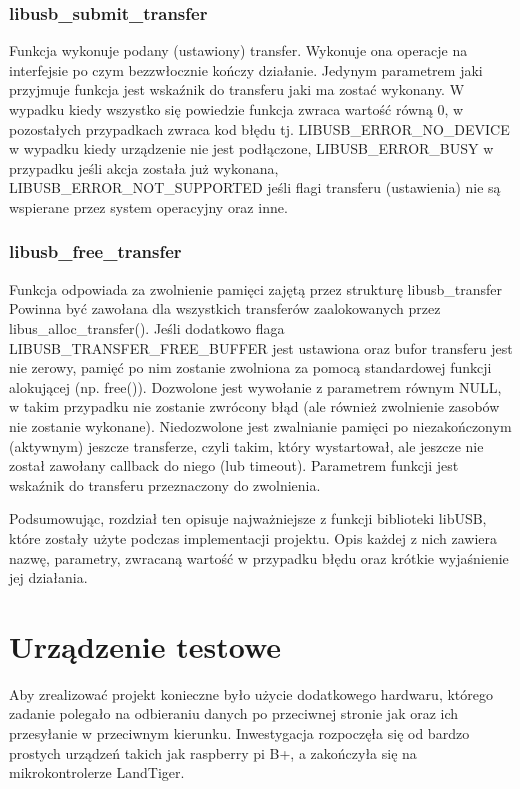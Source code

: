 \documentclass{BscUS}
\newcommand\blankpage{%
    \null
    \thispagestyle{empty}%
    \newpage}
\begin{document}
\subsection{libusb\_submit\_transfer}
\noindent Funkcja wykonuje podany (ustawiony) transfer.
Wykonuje ona operacje na interfejsie po czym bezzwłocznie kończy działanie.
Jedynym parametrem jaki przyjmuje funkcja jest wskaźnik do transferu jaki ma zostać wykonany.
\newline
W wypadku kiedy wszystko się powiedzie funkcja zwraca wartość równą 0, w pozostałych przypadkach zwraca kod błędu tj. LIBUSB\_ERROR\_NO\_DEVICE w wypadku kiedy urządzenie nie jest podłączone, LIBUSB\_ERROR\_BUSY w przypadku jeśli akcja została już wykonana, LIBUSB\_ERROR\_NOT\_SUPPORTED jeśli flagi transferu (ustawienia) nie są wspierane przez system operacyjny oraz inne.
\subsection{libusb\_free\_transfer}
\noindent Funkcja odpowiada za zwolnienie pamięci zajętą przez strukturę libusb\_transfer
Powinna być zawołana dla wszystkich transferów zaalokowanych przez libus\_alloc\_transfer().
Jeśli dodatkowo flaga LIBUSB\_TRANSFER\_FREE\_BUFFER jest ustawiona oraz bufor transferu jest nie zerowy, pamięć po nim zostanie zwolniona za pomocą standardowej funkcji alokującej (np. free()).
Dozwolone jest wywołanie z parametrem równym NULL, w takim przypadku nie zostanie zwrócony błąd (ale również zwolnienie zasobów nie zostanie wykonane).
Niedozwolone jest zwalnianie pamięci po niezakończonym (aktywnym) jeszcze transferze, czyli takim, który wystartował, ale jeszcze nie został zawołany callback do niego (lub timeout).
Parametrem funkcji jest wskaźnik do transferu przeznaczony do zwolnienia.
\newline

\indent Podsumowując, rozdział ten opisuje najważniejsze z funkcji biblioteki libUSB, które zostały użyte podczas implementacji projektu. Opis każdej z nich zawiera nazwę, parametry, zwracaną wartość w przypadku błędu oraz krótkie wyjaśnienie jej działania.
\afterpage{\blankpage}
\chapter{Urządzenie testowe}
\label{microcontrollerChapter}
Aby zrealizować projekt konieczne było użycie dodatkowego hardwaru, którego zadanie polegało na odbieraniu danych po przeciwnej stronie jak oraz ich przesyłanie w przeciwnym kierunku. Inwestygacja rozpoczęła się od bardzo prostych urządzeń takich jak raspberry pi B+, a zakończyła się na mikrokontrolerze LandTiger.
\end{document}

